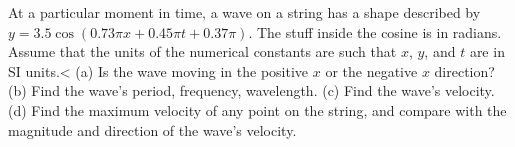 At a particular moment in time, a wave on a string
has a shape described by $y=3.5\cos (0.73\pi x+0.45\pi t+0.37\pi)$. The stuff
inside the cosine is in radians. Assume that the units of the numerical constants
are such that $x$, $y$, and $t$ are in SI units.<%
(a) Is the wave moving in the positive $x$ or the negative $x$ direction?\hwendpart
(b) Find the wave's period, frequency, wavelength.\hwendpart
(c) Find the wave's velocity. \hwendpart
(d) Find the maximum velocity of any point on the string, and compare with the
magnitude and direction of the wave's velocity. \answercheck
